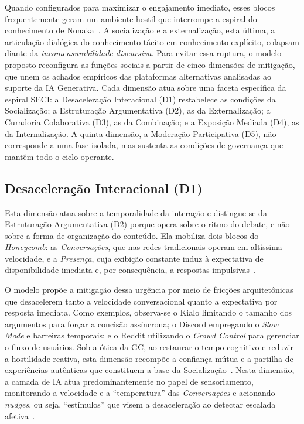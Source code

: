 \documentclass[conference]{IEEEtran} \IEEEoverridecommandlockouts %
\begin{document}
Quando configurados para maximizar o engajamento imediato, esses blocos frequentemente geram um ambiente hostil que interrompe a espiral do conhecimento de Nonaka~\cite{nonaka1994dynamic}. A socialização e a externalização, esta última, a articulação dialógica do conhecimento tácito em conhecimento explícito, colapsam diante da \textit{incomensurabilidade discursiva}. Para evitar essa ruptura, o modelo proposto reconfigura as funções sociais a partir de cinco dimensões de mitigação, que unem os achados empíricos das plataformas alternativas analisadas ao suporte da IA Generativa. Cada dimensão atua sobre uma faceta específica da espiral SECI: a Desaceleração Interacional (D1) restabelece as condições da Socialização; a Estruturação Argumentativa (D2), as da Externalização; a Curadoria Colaborativa (D3), as da Combinação; e a Exposição Mediada (D4), as da Internalização. A quinta dimensão, a Moderação Participativa (D5), não corresponde a uma fase isolada, mas sustenta as condições de governança que mantêm todo o ciclo operante.

\subsection{Desaceleração Interacional (D1)}

Esta dimensão atua sobre a temporalidade da interação e distingue-se da Estruturação Argumentativa (D2) porque opera sobre o ritmo do debate, e não sobre a forma de organização do conteúdo. Ela mobiliza dois blocos do \textit{Honeycomb}: as \textit{Conversações}, que nas redes tradicionais operam em altíssima velocidade, e a \textit{Presença}, cuja exibição constante induz à expectativa de disponibilidade imediata e, por consequência, a respostas impulsivas~\cite{kietzmannSocialMediaGet2011, oktaviaConceptualModelKnowledge2017}.

O modelo propõe a mitigação dessa urgência por meio de fricções arquitetônicas que desacelerem tanto a velocidade conversacional quanto a expectativa por resposta imediata. Como exemplos, observa-se o Kialo limitando o tamanho dos argumentos para forçar a concisão assíncrona; o Discord empregando o \textit{Slow Mode} e barreiras temporais; e o Reddit utilizando o \textit{Crowd Control} para gerenciar o fluxo de usuários. Sob a ótica da GC, ao restaurar o tempo cognitivo e reduzir a hostilidade reativa, esta dimensão recompõe a confiança mútua e a partilha de experiências autênticas que constituem a base da Socialização~\cite{nonaka1994dynamic}. Nesta dimensão, a camada de IA atua predominantemente no papel de sensoriamento, monitorando a velocidade e a ``temperatura'' das \textit{Conversações} e acionando \textit{nudges}, ou seja, ``estímulos'' que visem a desaceleração ao detectar escalada afetiva~\cite{brandiLLMMediatedNudgeBasedText}.
\end{document}
